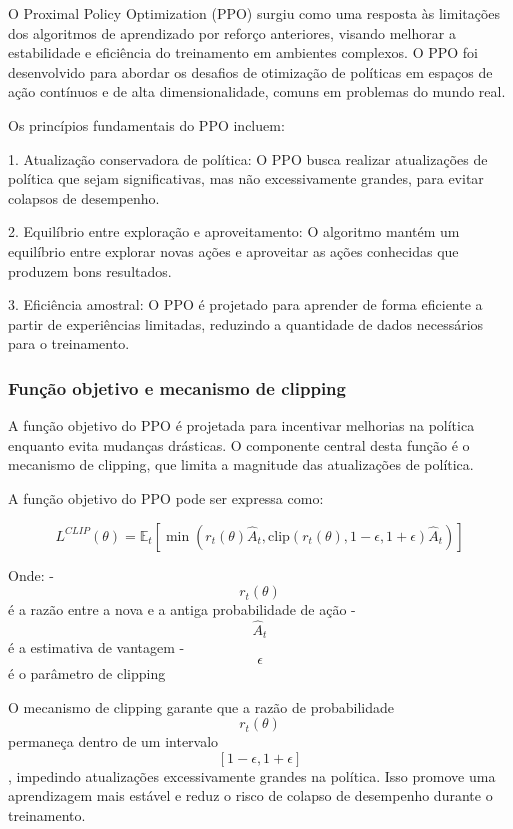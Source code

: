 O Proximal Policy Optimization (PPO) surgiu como uma resposta às limitações dos algoritmos de aprendizado por reforço anteriores, visando melhorar a estabilidade e eficiência do treinamento em ambientes complexos. O PPO foi desenvolvido para abordar os desafios de otimização de políticas em espaços de ação contínuos e de alta dimensionalidade, comuns em problemas do mundo real\cite{https://arxiv.org/abs/2404.02577}.

Os princípios fundamentais do PPO incluem:

1. Atualização conservadora de política: O PPO busca realizar atualizações de política que sejam significativas, mas não excessivamente grandes, para evitar colapsos de desempenho.

2. Equilíbrio entre exploração e aproveitamento: O algoritmo mantém um equilíbrio entre explorar novas ações e aproveitar as ações conhecidas que produzem bons resultados.

3. Eficiência amostral: O PPO é projetado para aprender de forma eficiente a partir de experiências limitadas, reduzindo a quantidade de dados necessários para o treinamento.

\subsubsection{Função objetivo e mecanismo de clipping}
\label{subsubsec:ppo_objetivo}

A função objetivo do PPO é projetada para incentivar melhorias na política enquanto evita mudanças drásticas. O componente central desta função é o mecanismo de clipping, que limita a magnitude das atualizações de política\cite{https://pubmed.ncbi.nlm.nih.gov/33705327}.

A função objetivo do PPO pode ser expressa como:

$$
L^{CLIP}(\theta) = \mathbb{E}_t[\min(r_t(\theta)\hat{A}_t, \text{clip}(r_t(\theta), 1-\epsilon, 1+\epsilon)\hat{A}_t)]
$$

Onde:
- $$r_t(\theta)$$ é a razão entre a nova e a antiga probabilidade de ação
- $$\hat{A}_t$$ é a estimativa de vantagem
- $$\epsilon$$ é o parâmetro de clipping

O mecanismo de clipping garante que a razão de probabilidade $$r_t(\theta)$$ permaneça dentro de um intervalo $$[1-\epsilon, 1+\epsilon]$$, impedindo atualizações excessivamente grandes na política. Isso promove uma aprendizagem mais estável e reduz o risco de colapso de desempenho durante o treinamento\cite{https://www.semanticscholar.org/paper/df03d874a7bfff4fb3a769c2c3615c034cc268f1}.

